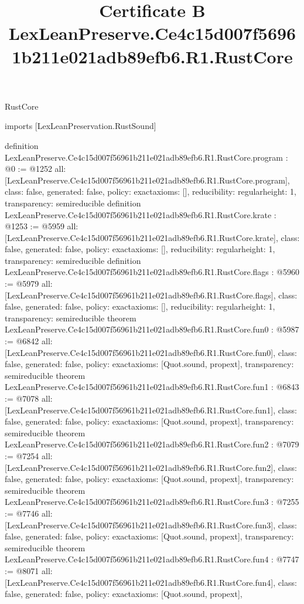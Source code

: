 \begin{lexlean}{RustCore}
\title{Certificate B LexLeanPreserve.Ce4c15d007f56961b211e021adb89efb6.R1.RustCore}
\begin{coremodule}
imports [LexLeanPreservation.RustSound]

definition LexLeanPreserve.Ce4c15d007f56961b211e021adb89efb6.R1.RustCore.program : @0 := @1252 {
  all: [LexLeanPreserve.Ce4c15d007f56961b211e021adb89efb6.R1.RustCore.program],
  class: false,
  generated: false,
  policy: exact{axioms: []},
  reducibility: regular{height: 1},
  transparency: semireducible
}
definition LexLeanPreserve.Ce4c15d007f56961b211e021adb89efb6.R1.RustCore.krate : @1253 := @5959 {
  all: [LexLeanPreserve.Ce4c15d007f56961b211e021adb89efb6.R1.RustCore.krate],
  class: false,
  generated: false,
  policy: exact{axioms: []},
  reducibility: regular{height: 1},
  transparency: semireducible
}
definition LexLeanPreserve.Ce4c15d007f56961b211e021adb89efb6.R1.RustCore.flags : @5960 := @5979 {
  all: [LexLeanPreserve.Ce4c15d007f56961b211e021adb89efb6.R1.RustCore.flags],
  class: false,
  generated: false,
  policy: exact{axioms: []},
  reducibility: regular{height: 1},
  transparency: semireducible
}
theorem LexLeanPreserve.Ce4c15d007f56961b211e021adb89efb6.R1.RustCore.fun0 : @5987 := @6842 {
  all: [LexLeanPreserve.Ce4c15d007f56961b211e021adb89efb6.R1.RustCore.fun0],
  class: false,
  generated: false,
  policy: exact{axioms: [Quot.sound, propext]},
  transparency: semireducible
}
theorem LexLeanPreserve.Ce4c15d007f56961b211e021adb89efb6.R1.RustCore.fun1 : @6843 := @7078 {
  all: [LexLeanPreserve.Ce4c15d007f56961b211e021adb89efb6.R1.RustCore.fun1],
  class: false,
  generated: false,
  policy: exact{axioms: [Quot.sound, propext]},
  transparency: semireducible
}
theorem LexLeanPreserve.Ce4c15d007f56961b211e021adb89efb6.R1.RustCore.fun2 : @7079 := @7254 {
  all: [LexLeanPreserve.Ce4c15d007f56961b211e021adb89efb6.R1.RustCore.fun2],
  class: false,
  generated: false,
  policy: exact{axioms: [Quot.sound, propext]},
  transparency: semireducible
}
theorem LexLeanPreserve.Ce4c15d007f56961b211e021adb89efb6.R1.RustCore.fun3 : @7255 := @7746 {
  all: [LexLeanPreserve.Ce4c15d007f56961b211e021adb89efb6.R1.RustCore.fun3],
  class: false,
  generated: false,
  policy: exact{axioms: [Quot.sound, propext]},
  transparency: semireducible
}
theorem LexLeanPreserve.Ce4c15d007f56961b211e021adb89efb6.R1.RustCore.fun4 : @7747 := @8071 {
  all: [LexLeanPreserve.Ce4c15d007f56961b211e021adb89efb6.R1.RustCore.fun4],
  class: false,
  generated: false,
  policy: exact{axioms: [Quot.sound, propext]},
}
\end{coremodule}
\end{lexlean}
